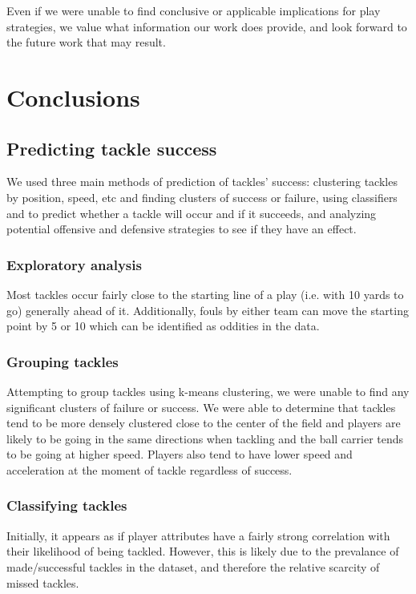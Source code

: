 \documentclass[bibtex, sigconf, hyperref={colorlinks=true,linkcolor=blue,urlcolor=blue}]{acmart}
\begin{document}
Even if we were unable to find conclusive or applicable implications for play strategies,
we value what information our work does provide, and look forward to the future work
that may result.

\section{Conclusions}

\subsection{Predicting tackle success}

We used three main methods of prediction of tackles' success:
clustering tackles by position, speed, etc and finding clusters of success or failure,
using classifiers and to predict whether a tackle will occur and if it succeeds,
and analyzing potential offensive and defensive strategies to see if they have an effect.

\subsubsection{Exploratory analysis}

Most tackles occur fairly close to the starting line of a play (i.e. with 10
yards to go) generally ahead of it. Additionally, fouls by either team can move
the starting point by 5 or 10 which can be identified as oddities in the data.

\subsubsection{Grouping tackles}

Attempting to group tackles using k-means clustering, we were unable to find
any significant clusters of failure or success. We were able to determine that
tackles tend to be more densely clustered close to the center of the field and
players are likely to be going in the same directions when tackling and the
ball carrier tends to be going at higher speed. Players also tend to have lower
speed and acceleration at the moment of tackle regardless of success.

\subsubsection{Classifying tackles}

Initially, it appears as if player attributes have a fairly strong correlation
with their likelihood of being tackled. However, this is likely due to the
prevalance of made/successful tackles in the dataset, and therefore the
relative scarcity of missed tackles.
\end{document}
